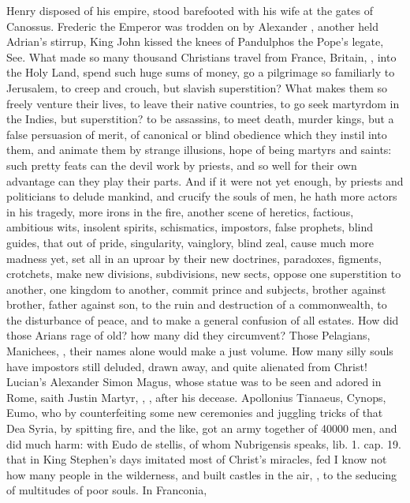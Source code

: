 {Henry  disposed of his empire, stood barefooted with his wife
at the gates of Canossus. Frederic the Emperor was trodden on by
Alexander , another held Adrian's stirrup, King John kissed the
knees of Pandulphos the Pope's legate, See. What made so many thousand
Christians travel from France, Britain, \etc{}, into the Holy Land, spend
such huge sums of money, go a pilgrimage so familiarly to Jerusalem, to
creep and crouch, but slavish superstition? What makes them so freely
venture their lives, to leave their native countries, to go seek
martyrdom in the Indies, but superstition? to be assassins, to meet
death, murder kings, but a false persuasion of merit, of canonical or
blind obedience which they instil into them, and animate them by
strange illusions, hope of being martyrs and saints: such pretty feats
can the devil work by priests, and so well for their own advantage can
they play their parts. And if it were not yet enough, by priests and
politicians to delude mankind, and crucify the souls of men, he hath
more actors in his tragedy, more irons in the fire, another scene of
heretics, factious, ambitious wits, insolent spirits, schismatics,
impostors, false prophets, blind guides, that out of pride,
singularity, vainglory, blind zeal, cause much more madness yet, set
all in an uproar by their new doctrines, paradoxes, figments,
crotchets, make new divisions, subdivisions, new sects, oppose one
superstition to another, one kingdom to another, commit prince and
subjects, brother against brother, father against son, to the ruin and
destruction of a commonwealth, to the disturbance of peace, and to make
a general confusion of all estates. How did those Arians rage of old?
how many did they circumvent? Those Pelagians, Manichees, \etc{}, their
names alone would make a just volume. How many silly souls have
impostors still deluded, drawn away, and quite alienated from Christ!
Lucian's Alexander Simon Magus, whose statue was to be seen and adored
in Rome, saith Justin Martyr, , \etc{}, after his
decease. Apollonius Tianaeus, Cynops, Eumo, who by counterfeiting
some new ceremonies and juggling tricks of that Dea Syria, by spitting
fire, and the like, got an army together of 40\thinspace{}000 men, and did much
harm: with \textlatin{Eudo de stellis}, of whom Nubrigensis speaks, \textlatin{lib. 1. cap.
19.} that in King Stephen's days imitated most of Christ's miracles, fed
I know not how many people in the wilderness, and built castles in the
air, \etc{}, to the seducing of multitudes of poor souls. In Franconia,
}
